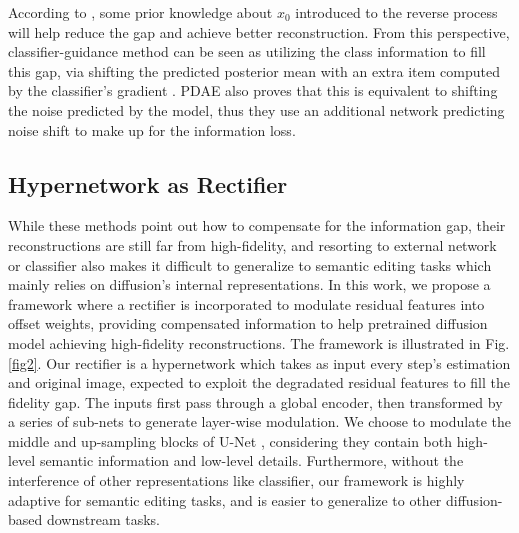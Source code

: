 \documentclass[letterpaper]{article} %
\begin{document}
According to \cite{zhang2022unsupervised}, some prior knowledge about $x_0$ introduced to the reverse process will help reduce the gap and achieve better reconstruction. From this perspective, classifier-guidance \cite{dhariwal2021diffusion} method can be seen as utilizing the class information to fill this gap, via shifting the predicted posterior mean with an extra item computed by the classifier's gradient \cite{zhang2022unsupervised}. PDAE also proves that this is equivalent to shifting the noise predicted by the model, thus they use an additional network predicting noise shift to make up for the information loss.

\subsection{Hypernetwork as Rectifier}
While these methods point out how to compensate for the information gap, their reconstructions are still far from high-fidelity, and resorting to external network or classifier also makes it difficult to generalize to semantic editing tasks which  mainly relies on diffusion's internal representations. In this work, we propose a framework where a rectifier is incorporated to modulate residual features into offset weights, providing compensated information to help pretrained diffusion model achieving high-fidelity reconstructions. The framework is illustrated in Fig. \ref{fig2}. 
Our rectifier is a hypernetwork \cite{david2016hypernetworks} which takes as input every step's estimation and original image, expected to exploit the degradated residual features to fill the fidelity gap.
The inputs first pass through a global encoder, then transformed by a series of sub-nets to generate layer-wise modulation. 
We choose to modulate the middle and up-sampling blocks of U-Net \cite{ronneberger2015u}, considering they contain both high-level semantic information and low-level details. Furthermore, without the interference of other representations like classifier, our framework is highly adaptive for semantic editing tasks, and is easier to generalize to other diffusion-based downstream tasks.
\end{document}
